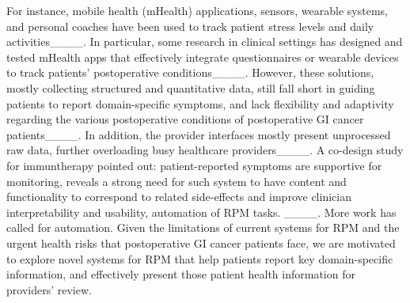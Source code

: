 For instance, mobile health (mHealth) applications, sensors, wearable systems, and personal coaches have been used to track patient stress levels and daily activities____. 
In particular, some research in clinical settings has designed and tested mHealth apps that effectively integrate questionnaires or wearable devices to track patients' postoperative conditions____.
However, these solutions, mostly collecting structured and quantitative data, still fall short in guiding patients to report domain-specific symptoms, and lack flexibility and adaptivity regarding the various postoperative conditions of postoperative GI cancer patients____. In addition, the provider interfaces mostly present unprocessed raw data, further overloading busy healthcare providers____. A co-design study for immuntherapy pointed out: patient-reported symptoms are supportive for monitoring, reveals a strong need for such system to have content and functionality to correspond to related side-effects and improve clinician interpretability and usability, automation of RPM tasks. ____. More work has called for automation.
Given the limitations of current systems for RPM and the urgent health risks that postoperative GI cancer patients face, we are motivated to explore novel systems for RPM that help patients report key domain-specific information, and effectively present those patient health information for providers' review.

